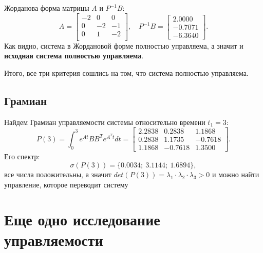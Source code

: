 Жорданова форма матрицы $A$ и $P^{-1}B$:
\begin{equation*}
    A =\begin{bmatrix}
        
-2&	   0&	   0\\
0&	  -2&	   -1\\
0&	   1&	  -2\\

    \end{bmatrix},\quad
    P^{-1}B=\begin{bmatrix}
        2.0000 \\ -0.7071 \\ -6.3640
    \end{bmatrix}.
\end{equation*}
Как видно, система в Жордановой форме полностью управляема, а значит и \textbf{исходная система
полностью управляема}.

Итого, все три критерия сошлись на том, что система полностью управляема.

\subsection{Грамиан}

Найдем Грамиан управляемости системы относительно времени $t_1=3$:
\begin{equation*}
    P(3)=\int_{0}^{3}e^{At}BB^Te^{A^Tt}dt=
    \begin{bmatrix}
        2.2838  &  0.2838  &  1.1868 \\
        0.2838   & 1.1735  & -0.7618 \\
        1.1868  & -0.7618  &  1.3500
    \end{bmatrix}.
\end{equation*}
Его спектр:
\begin{equation*}
    \sigma(P(3))=\{ 0.0034;\ 
    3.1144;\ 
    1.6894\},
\end{equation*}
все числа положительны, а значит $det(P(3))=\lambda_1\cdot\lambda_2\cdot\lambda_3>0$ и
можно найти управление, которое переводит систему



\section{Еще одно исследование управляемости}

